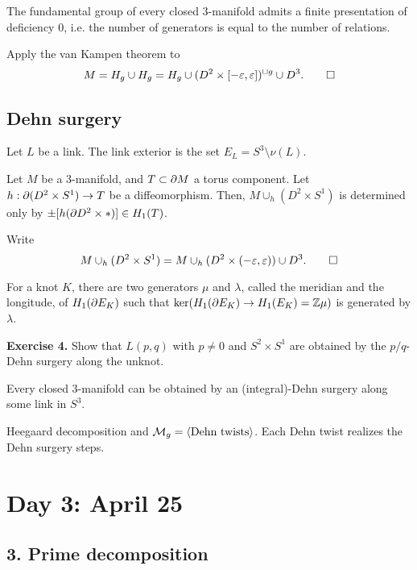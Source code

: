 \documentclass{../../small}
\begin{document}
\begin{cor}
The fundamental group of every closed 3-manifold admits a finite presentation of deficiency 0, i.e. the number of generators is equal to the number of relations.
\end{cor}
\begin{pf}
Apply the van Kampen theorem to
\[M=H_g\cup H_g=H_g\cup(D^2\times[-\varepsilon,\varepsilon])^{\sqcup g}\cup D^3.\qedhere\]
\end{pf}

\subsection{Dehn surgery}
Let $L$ be a link.
The link exterior is the set $E_L=S^3\setminus\nu(L)$.

\begin{prop}
Let $M$ be a 3-manifold, and $T\subset\pd M$ a torus component.
Let $h:\pd(D^2\times S^1)\to T$ be a diffeomorphism.
Then, $M\cup_h(D^2\times S^1)$ is determined only by $\pm[h(\pd D^2\times*)]\in H_1(T)$.
\end{prop}
\begin{pf}
Write
\[M\cup_h(D^2\times S^1)=M\cup_h(D^2\times(-\varepsilon,\varepsilon))\cup D^3.\qedhere\]
\end{pf}
For a knot $K$, there are two generators $\mu$ and $\lambda$, called the meridian and the longitude, of $H_1(\pd E_K)$ such that $\ker(H_1(\pd E_K)\to H_1(E_K)=\Z\mu)$ is generated by $\lambda$.

\textbf{Exercise 4.} Show that $L(p,q)$ with $p\ne0$ and $S^2\times S^1$ are obtained by the $p/q$-Dehn surgery along the unknot.

\begin{thm}
Every closed 3-manifold can be obtained by an (integral)-Dehn surgery along some link in $S^3$.
\end{thm}
\begin{pf}[Sketch]
Heegaard decomposition and $\mathcal{M}_g=\langle\text{Dehn twists}\rangle$.
Each Dehn twist realizes the Dehn surgery steps.
\end{pf}

\newpage
\section{Day 3: April 25}
\subsection*{3. Prime decomposition}
\end{document}

